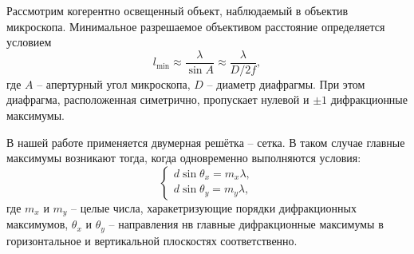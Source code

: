 \documentclass[a4paper,12pt]{article} %
\begin{document}
	Рассмотрим когерентно освещенный объект, наблюдаемый в объектив микроскопа. Минимальное разрешаемое объективом расстояние определяется условием
	\begin{equation}
		\label{min}
		l_{\text{min}} \approx \frac{\lambda}{\sin A} \approx \frac{\lambda}{D/2f},
	\end{equation}
	где $A$ -- апертурный угол микроскопа, $D$ -- диаметр диафрагмы. При этом диафрагма, расположенная симетрично, пропускает нулевой и $\pm 1$ дифракционные максимумы.
	
	В нашей работе применяется двумерная решётка -- сетка. В таком случае главные максимумы возникают тогда, когда одновременно выполняются условия:
	\begin{equation}
		\label{system}
		\begin{cases}
			d \sin \theta_x = m_x \lambda, \\
			d \sin \theta_y = m_y \lambda,
		\end{cases}
	\end{equation}
	где $m_x$ и $m_y$ -- целые числа, харакетризующие порядки дифракционных максимумов, $\theta_x$ и $\theta_y$ -- направления нв главные дифракционные максимумы в горизонтальное и вертикальной плоскостях соответственно.
	
\end{document}
